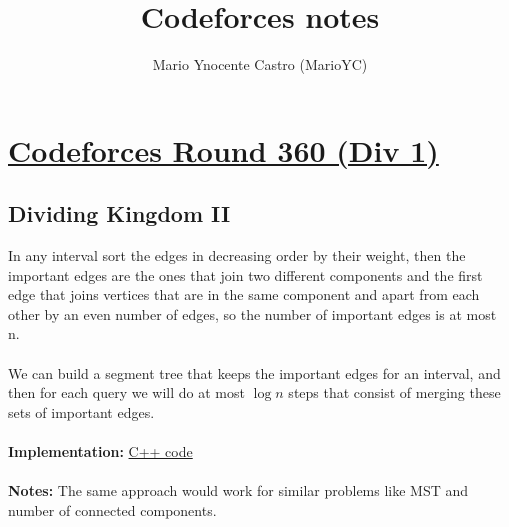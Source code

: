 \documentclass[a4paper,12pt]{article}
\title{Codeforces notes}
\author{Mario Ynocente Castro (MarioYC)}
\date{}
\begin{document}
\maketitle
\thispagestyle{empty}

\newpage
\tableofcontents

\newpage
\section{\href{http://codeforces.com/contest/687}{Codeforces Round 360 (Div 1)}}

\subsection{Dividing Kingdom II}

In any interval sort the edges in decreasing order by their weight, then the important edges are the ones that join two different components and the first edge that joins vertices that are in the same component and apart from each other by an even number of edges, so the number of important edges is at most n.
\\ \\
We can build a segment tree that keeps the important edges for an interval, and then for each query we will do at most $\log n$ steps that consist of merging these sets of important edges.
\\ \\
\textbf{Implementation:} \href{http://codeforces.com/contest/687/submission/19196725}{C++ code}
\\ \\
\textbf{Notes:} The same approach would work for similar problems like MST and number of connected components.
\end{document}
